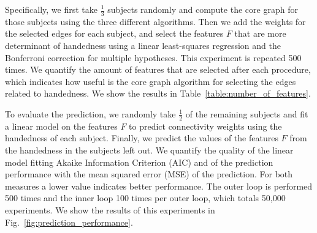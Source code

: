 Specifically, we first take $\tfrac 1 3$ subjects randomly and compute the core graph for those subjects using the three different algorithms. Then we add the weights for the selected edges for each subject, and select the features $F$ that are more determinant of handedness using a linear least-squares regression and the Bonferroni correction for multiple hypotheses. This experiment is repeated 500 times. We quantify the amount of features that are selected after each procedure, which indicates how useful is the core graph algorithm for selecting the edges related to handedness. %
We show the results in Table~\ref{table:number_of_features}.

To evaluate the prediction, we randomly take $\tfrac 1 2$ of the remaining subjects and fit a linear model on the features $F$ to predict connectivity weights using the handedness of each subject. Finally, we predict the values of the features $F$ from the handedness in the subjects left out. We quantify the quality of the linear model fitting Akaike Information Criterion (AIC) and of the prediction performance with the mean squared error (MSE) of the prediction. For both measures a lower value indicates better performance. The outer loop is performed 500 times and the inner loop 100 times per outer loop, which totals 50,000 experiments. We show the results of this experiments in Fig.~\ref{fig:prediction_performance}.

